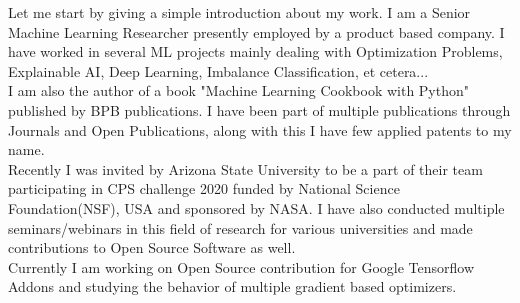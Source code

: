 
\begin{justify}
    Let me start by giving a simple introduction about my work. I am a Senior Machine Learning Researcher presently employed by a product based company. I have worked in several ML projects mainly dealing with Optimization Problems, Explainable AI, Deep Learning, Imbalance Classification, et cetera...\\
    I am also the author of a book "Machine Learning Cookbook with Python" published by BPB publications. I have been part of multiple publications through Journals and Open Publications, along with this I have few applied patents to my name.\\
    Recently I was invited by Arizona State University to be a part of their team participating in CPS challenge 2020 funded by National Science Foundation(NSF), USA and sponsored by NASA. I have also conducted multiple seminars/webinars in this field of research for various universities and made contributions to Open Source Software as well.\\
    Currently I am working on Open Source contribution for Google Tensorflow Addons and studying the behavior of multiple gradient based optimizers.
\end{justify}
